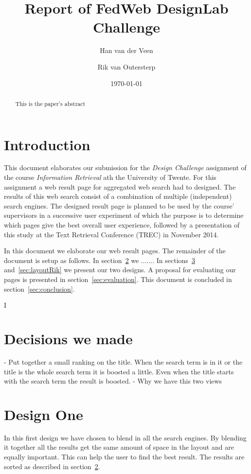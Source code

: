 \documentclass[12pt]{article}
\title{Report of FedWeb DesignLab Challenge}
\author{
        Han van der Veen \\
            \and
			Rik van Outersterp
}
\date{\today}
\begin{document}
\maketitle

\begin{abstract}
This is the paper's abstract
\end{abstract}

\section{Introduction}
This document elaborates our submission for the \textit{Design Challenge} assignment of the course \textit{Information Retrieval} ath the University of Twente. 
For this assignment a web result page for aggregated web search had to designed.
The results of this web search consist of a combination of multiple (independent) search engines.
The designed result page is planned to be used by the course' supervisors in a successive user experiment of which the purpose is to determine which pages give the best overall user experience, followed by a presentation of this study at the Text Retrieval Conference (TREC) in November 2014.

In this document we elaborate our web result pages.
The remainder of the document is setup as follows.
In section~\ref{sec:decisions} we .......
In sections~\ref{sec:layoutHan} and~\ref{sec:layoutRik} we present our two designs. 
A proposal for evaluating our pages is presented in section~\ref{sec:evaluation}.
This document is concluded in section~\ref{sec:conclusion}.

I

\section{Decisions we made}
\label{sec:decisions}
- Put together a small ranking on the title. When the search term is in it or the title is the whole search term it is boosted a little. Even when the title starts with the search term the result is boosted. 
- Why we have this two views

\section{Design One}
\label{sec:layoutHan}
In this first design we have chosen to blend in all the search engines. By blending it together all the results get the same amount of space in the layout and are equally important. This can help the user to find the best result. The results are sorted as described in section~\ref{sec:decisions}. 
\end{document}
